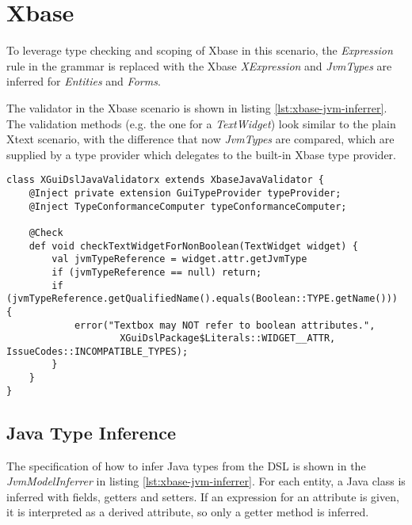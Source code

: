 \section{Xbase}
\label{sec:xbase}

To leverage type checking and scoping of Xbase in this scenario, the
\emph{Expression} rule in the grammar is replaced with the Xbase
\emph{XExpression} and \emph{JvmTypes} are inferred for \emph{Entities} and
\emph{Forms}.

The validator in the Xbase scenario is shown in listing
\ref{lst:xbase-jvm-inferrer}. The validation methods (e.g. the one for a
\emph{TextWidget}) look similar to the plain Xtext scenario, with the difference
that now \emph{JvmTypes} are compared, which are supplied by a type provider
which delegates to the built-in Xbase type provider.


\begin{lstlisting}[language=xtend,float=tb,label=lst:xbase-validator,caption=Xtext
validator in the Xbase scenario.] 
class XGuiDslJavaValidatorx extends XbaseJavaValidator {
	@Inject private extension GuiTypeProvider typeProvider;
	@Inject TypeConformanceComputer typeConformanceComputer;

	@Check
	def void checkTextWidgetForNonBoolean(TextWidget widget) {
		val jvmTypeReference = widget.attr.getJvmType
		if (jvmTypeReference == null) return;
		if (jvmTypeReference.getQualifiedName().equals(Boolean::TYPE.getName())) {
			error("Textbox may NOT refer to boolean attributes.",
					XGuiDslPackage$Literals::WIDGET__ATTR, IssueCodes::INCOMPATIBLE_TYPES);
		}
	}
}
\end{lstlisting}

\subsection{Java Type Inference}
The specification of how to infer Java types from the DSL is shown in the
\emph{JvmModelInferrer} in listing \ref{lst:xbase-jvm-inferrer}.  For each
entity, a Java class is inferred with fields, getters and setters. If an
expression for an attribute is given, it is interpreted as a derived attribute,
so only a getter method is inferred.


